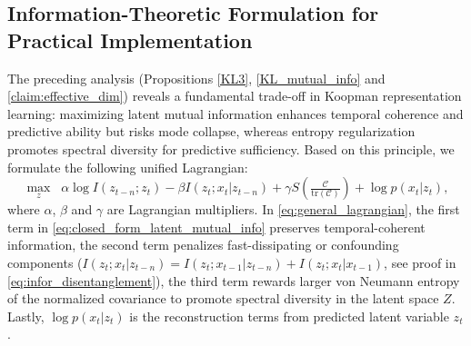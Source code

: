 \documentclass{article} %
\newcommand{\zs}[1]{\textcolor{blue}{[ZS: #1]}}
\begin{document}

\subsection{Information-Theoretic Formulation for Practical Implementation}

The preceding analysis (Propositions \ref{KL3}, \ref{KL_mutual_info} and \ref{claim:effective_dim}) reveals a fundamental trade-off in Koopman representation learning: maximizing latent mutual information enhances temporal coherence and predictive ability but risks mode collapse, whereas entropy regularization promotes spectral diversity for predictive sufficiency. Based on this principle, we formulate the following unified Lagrangian:
\begin{equation} \label{eq:general_lagrangian}
\max_z \;\; \alpha  \log I(z_{t-n}; z_t) - \beta I(z_t; x_{t} | z_{t-n}) + \gamma  S\!\left(\tfrac{\mathcal{C}}{\mathrm{tr}(\mathcal{C})}\right) + \log p(x_t|z_t),
\end{equation}
where $\alpha$, $\beta$ and $\gamma$ are Lagrangian multipliers. In \eqref{eq:general_lagrangian}, the first term in \eqref{eq:closed_form_latent_mutual_info} preserves temporal-coherent information, the second term penalizes fast-dissipating or confounding components ($I(z_t; x_{t} | z_{t-n}) = I(z_{t}; x_{t-1}|z_{t-n}) + I(z_t; x_t|x_{t-1})$, see proof in \eqref{eq:infor_disentanglement}), the third term rewards larger von Neumann entropy of the normalized covariance to promote spectral diversity in the latent space $Z$. Lastly, $\log p(x_t|z_t)$ is the reconstruction terms from predicted latent variable $z_t$.

\end{document}
